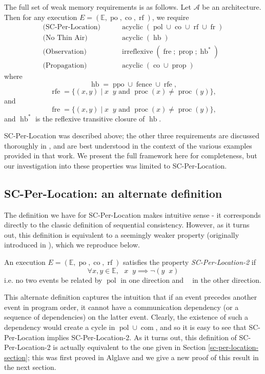 \documentclass[]{eptcs}
\newenvironment{definition}[1][Definition.]{\begin{trivlist}
\item[\hskip \labelsep {\bfseries #1}]}{\end{trivlist}}
\DeclareMathOperator{\proc}{proc}
\DeclareMathOperator{\acyclic}{acyclic}
\DeclareMathOperator{\irreflexive}{irreflexive}
\DeclareMathOperator{\po}{po}
\DeclareMathOperator{\pol}{pol}
\DeclareMathOperator{\co}{co}
\DeclareMathOperator{\rf}{rf}
\DeclareMathOperator{\rfe}{rfe}
\DeclareMathOperator{\fr}{fr}
\DeclareMathOperator{\fre}{fre}
\DeclareMathOperator{\com}{com}
\DeclareMathOperator{\comp}{com^+}
\DeclareMathOperator{\hb}{hb}
\DeclareMathOperator{\ppo}{ppo}
\DeclareMathOperator{\fence}{fence}
\DeclareMathOperator{\prop}{prop}
\DeclareMathOperator{\polto}{\xrightarrow{pol}}
\DeclareMathOperator{\rfto}{\xrightarrow{rf}}
\DeclareMathOperator{\frto}{\xrightarrow{fr}}
\DeclareMathOperator{\compto}{\xrightarrow{com^+}}
\begin{document}
The full set of weak memory requirements is as follows. Let $\mathcal{A}$ be an architecture. Then for any execution $E = (\mathbb{E}, \po, \co, \rf)$, we require
\[
\begin{aligned}
  \text{(SC-Per-Location)  } &&& \acyclic(\pol \cup \co \cup \rf \cup \fr)\\
  \text{(No Thin Air)  } &&& \acyclic(\hb)\\
  \text{(Observation)  } &&& \irreflexive(\fre ; \prop; \hb^*)\\
  \text{(Propagation)  } &&& \acyclic(\co \cup \prop)
\end{aligned}
\]
where 
\[
\hb = \ppo \cup \fence \cup \rfe,
\] 
\[
\rfe = \{(x,y) \mid x \rfto y \text{ and } \proc(x) \neq \proc(y)\},
\] 
and 
\[
\fre = \{(x,y) \mid x \frto y \text{ and } \proc(x) \neq \proc(y)\},
\] 
and $\hb^*$ is the reflexive transitive closure of $\hb$.

SC-Per-Location was described above; the other three requirements are discussed thoroughly in \cite{alglave_cats}, and are best understood in the context of the various examples provided in that work. We present the full framework here for completeness, but our investigation into these properties was limited to SC-Per-Location.

\subsection{SC-Per-Location: an alternate definition}

The definition we have for SC-Per-Location makes intuitive sense - it corresponds directly to the classic definition of sequential consistency. However, as it turns out, this definition is equivalent to a seemingly weaker property (originally introduced in \cite{alglave_thesis}), which we reproduce below. 

\begin{definition}
An execution $E = (\mathbb{E}, \po, \co, \rf)$ satisfies the property \emph{SC-Per-Location-2} if 
\[
\forall x, y \in \mathbb{E}, \text{ } x \polto y \implies \neg (y \compto x)
\]
i.e. no two events be related by $\pol$ in one direction and $\comp$ in the other direction.
\end{definition}

This alternate definition captures the intuition that if an event precedes another event in program order, it cannot have a communication dependency (or a sequence of dependencies) on the latter event. Clearly, the existence of such a dependency would create a cycle in $\pol \cup \com$, and so it is easy to see that SC-Per-Location implies SC-Per-Location-2. As it turns out, this definition of SC-Per-Location-2 is actually equivalent to the one given in Section \ref{sc-per-location-section}; this was first proved in Alglave \cite{alglave_thesis} and we give a new proof of this result in the next section.
\end{document}
